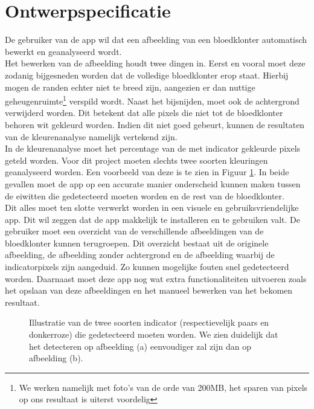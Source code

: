 \documentclass[a4paper,kulak]{kulakarticle}
\begin{document}
\section{Ontwerpspecificatie}
De gebruiker van de app wil dat een afbeelding van een bloedklonter automatisch bewerkt en geanalyseerd wordt.\\
Het bewerken van de afbeelding houdt twee dingen in. Eerst en vooral moet deze zodanig bijgesneden worden dat de volledige bloedklonter erop staat. Hierbij mogen de randen echter niet te breed zijn, aangezien er dan nuttige geheugenruimte\footnote{We werken namelijk met foto's van de orde van 200MB, het sparen van pixels op ons resultaat is uiterst voordelig} verspild wordt. 
Naast het bijsnijden, moet ook de achtergrond verwijderd worden. Dit betekent dat alle pixels die niet tot de bloedklonter behoren wit gekleurd worden. Indien dit niet goed gebeurt, kunnen de resultaten van de kleurenanalyse namelijk vertekend zijn.\\
In de kleurenanalyse moet het percentage van de met indicator gekleurde pixels geteld worden. Voor dit project moeten slechts twee soorten kleuringen geanalyseerd worden. Een voorbeeld van deze is te zien in Figuur \ref{figuur indicators}. In beide gevallen moet de app op een accurate manier onderscheid kunnen maken tussen de eiwitten die gedetecteerd moeten worden en de rest van de bloedklonter. \\
Dit alles moet ten slotte verwerkt worden in een visuele en gebruiksvriendelijke app. Dit wil zeggen dat de app makkelijk te installeren en te gebruiken valt. De gebruiker moet een overzicht van de verschillende afbeeldingen van de bloedklonter kunnen terugroepen. Dit overzicht bestaat uit de originele afbeelding, de afbeelding zonder achtergrond en de afbeelding waarbij de indicatorpixels zijn aangeduid. Zo kunnen mogelijke fouten snel gedetecteerd worden. Daarnaast moet deze app nog wat extra functionaliteiten uitvoeren zoals het opslaan van deze afbeeldingen en het manueel bewerken van het bekomen resultaat.

\begin{figure}[H]
	\centering
	\qquad
	
	\caption{Illustratie van de twee soorten indicator (respectievelijk paars en donkerroze) die gedetecteerd moeten worden. We zien duidelijk dat het detecteren op afbeelding (a) eenvoudiger zal zijn dan op afbeelding (b).}
	\label{figuur indicators}
\end{figure}
\end{document}
